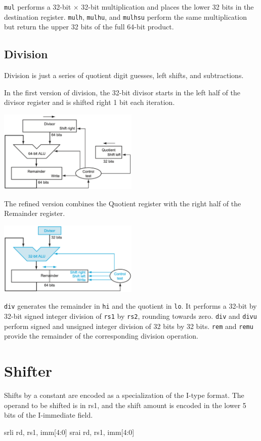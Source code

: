 \verb|mul| performs a 32-bit \(\times\) 32-bit multiplication and places the lower 32 bits in the destination register. \verb|mulh|, \verb|mulhu|, and \verb|mulhsu| perform the same multiplication but return the upper 32 bits of the full 64-bit product.

\subsection{Division}
Division is just a series of quotient digit guesses, left shifts, and subtractions.

In the first version of division, the 32-bit divisor starts in the left half of the divisor register and is shifted right 1 bit each iteration.
\begin{center}
  \includegraphics[width=0.5\textwidth]{Figure/div_1.png}
\end{center}

The refined version combines the Quotient register with the right half of the Remainder register.
\begin{center}
  \includegraphics[width=0.5\textwidth]{Figure/div_2.png}
\end{center}

\verb|div| generates the remainder in \verb|hi| and the quotient in \verb|lo|. It performs a 32-bit by 32-bit signed integer division of \verb|rs1| by \verb|rs2|, rounding towards zero. \verb|div| and \verb|divu| perform signed and unsigned integer division of 32 bits by 32 bits. \verb|rem| and \verb|remu| provide the remainder of the corresponding division operation.

\section{Shifter}
Shifts by a constant are encoded as a specialization of the I-type format. The operand to be shifted is in rs1, and the shift amount is encoded in the lower 5 bits of the I-immediate field.
\begin{codeBlock}
  srli rd, rs1, imm[4:0]
  srai rd, rs1, imm[4:0]
\end{codeBlock}

